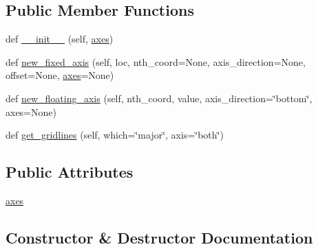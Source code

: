 \subsection*{Public Member Functions}
\begin{DoxyCompactItemize}
\item 
def \hyperlink{classaxisartist_1_1axislines_1_1GridHelperRectlinear_a34461ca8ea53f6274d093857735c414f}{\+\_\+\+\_\+init\+\_\+\+\_\+} (self, \hyperlink{classaxisartist_1_1axislines_1_1GridHelperRectlinear_a5a1d99a92356c652a2209da4fe66e444}{axes})
\item 
def \hyperlink{classaxisartist_1_1axislines_1_1GridHelperRectlinear_a63f7fb9506e38df4da362b2c622bfef3}{new\+\_\+fixed\+\_\+axis} (self, loc, nth\+\_\+coord=None, axis\+\_\+direction=None, offset=None, \hyperlink{classaxisartist_1_1axislines_1_1GridHelperRectlinear_a5a1d99a92356c652a2209da4fe66e444}{axes}=None)
\item 
def \hyperlink{classaxisartist_1_1axislines_1_1GridHelperRectlinear_a63f165fe4ae712c38fe63ea6484d3740}{new\+\_\+floating\+\_\+axis} (self, nth\+\_\+coord, value, axis\+\_\+direction=\char`\"{}bottom\char`\"{}, axes=None)
\item 
def \hyperlink{classaxisartist_1_1axislines_1_1GridHelperRectlinear_a82d160598d0c73295890cba721d6939f}{get\+\_\+gridlines} (self, which=\char`\"{}major\char`\"{}, axis=\char`\"{}both\char`\"{})
\end{DoxyCompactItemize}
\subsection*{Public Attributes}
\begin{DoxyCompactItemize}
\item 
\hyperlink{classaxisartist_1_1axislines_1_1GridHelperRectlinear_a5a1d99a92356c652a2209da4fe66e444}{axes}
\end{DoxyCompactItemize}


\subsection{Constructor \& Destructor Documentation}
\mbox{\label{classaxisartist_1_1axislines_1_1GridHelperRectlinear_a34461ca8ea53f6274d093857735c414f}} 
